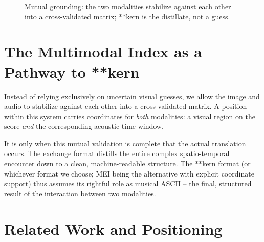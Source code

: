 \documentclass[11pt,a4paper]{article}
\begin{document}
\begin{figure}[ht]
\centering
{}
\caption{Mutual grounding: the two modalities stabilize against each other into a cross-validated matrix; **kern is the distillate, not a guess.}
\label{fig:jording}
\end{figure}

\section{The Multimodal Index as a Pathway to **kern}

Instead of relying exclusively on uncertain visual guesses, we allow the image and audio to stabilize against each other into a cross-validated matrix. A position within this system carries coordinates for \emph{both} modalities: a visual region on the score \emph{and} the corresponding acoustic time window.

It is only when this mutual validation is complete that the actual translation occurs. The exchange format distills the entire complex spatio-temporal encounter down to a clean, machine-readable structure. The **kern format (or whichever format we choose; MEI being the alternative with explicit coordinate support) thus assumes its rightful role as musical ASCII -- the final, structured result of the interaction between two modalities.

\section{Related Work and Positioning}
\label{sec:related}
\end{document}

